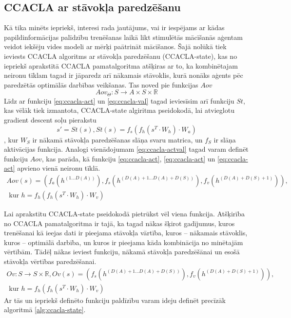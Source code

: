 \documentclass{ludis} %
\begin{document}
\subsection{CCACLA ar stāvokļa paredzēšanu}
Kā tika minēts iepriekš, interesi rada jautājums, vai ir iespējams ar kādas
papildinformācijas palīdzību trenēšanas laikā likt stimulētās mācīšanās aģentam
veidot iekšēju vides modeli ar mērķi paātrināt mācīšanos. Šajā nolūkā tiek
ieviests CCACLA algoritms ar stāvokļa paredzēšanu (CCACLA-state), kas no iepriekš aprakstītā
CCACLA pamatalgoritma atšķiras ar to, ka kombinētajam neironu tīklam tagad ir
jāparedz arī nākamais stāvoklis, kurā nonāks aģents pēc paredzētās optimālās
darbības veikšanas. Tas noved pie funkcijas $Aov$ 
\begin{equation}
  Aov_\Theta:S \rightarrow A \times S \times \mathbb{R}
\end{equation}
Līdz ar funkciju \ref{eq:ccacla-act} un \ref{eq:ccacla-val} tagad ieviesīsim arī
funkciju $St$, kas vēlāk tiek izmantota, CCACLA-state algiritma pseidokodā, lai
atvieglotu gradient descent soļu pierakstu
\begin{equation}\label{eq:ccacla-obs}
  s' = St(s), St(s) = f_s(f_h(s^T \cdot W_h) \cdot W_a)
\end{equation} 
, kur $W_S$ ir nākamā stāvokļa paredzēšanas slāņa svaru matrica, un $f_S$ ir
slāņa aktivācijas funkcija.
Analogi vienādojumam \ref{eq:ccacla-actval} tagad varam definēt funkciju $Aov$,
kas parāda, kā funkciju \ref{eq:ccacla-act}, \ref{eq:ccacla-act} un
\ref{eq:ccacla-act} apvieno vienā neironu tīklā.
\begin{multline}\label{eq:ccacla-actobsval}
  Aov(s) = \left(f_a(h^{(1 \ldots D(A))}),
                 f_s(h^{(D(A) + 1 \ldots D(A) + D(S))}),
                 f_v(h^{(D(A) + D(S) + 1)})\right), \\
  \text{ kur } h = f_h\left(f_h(s^T \cdot W_h) \cdot W_v\right)
\end{multline}

Lai aprakstītu CCACLA-state pseidokodā pietrūkst vēl viena funkcija. Atšķirība no
CCACLA pamatalgoritma ir tajā, ka tagad nākas šķirot gadījumus, kuros
trenēšanai kā ieejas dati ir pieejama stāvokļa vārtība, kuros -- nākamais
stāvoklis, kuros -- optimālā darbība, un kuros ir pieejama kāda kombinācija no
minētajām vērtībām. Tādēļ nākas ieviest funkciju, nākamā stāvokļa paredzēšānai
un esošā stāvokļa vērtības paredzēšanai.
\begin{multline}\label{eq:ccacla-obsval}
  Ov: S \rightarrow S \times \mathbb{R},
        Ov(s) = \left(f_s(h^{(D(A) + 1 \ldots D(A) + D(S))}),
                 f_v(h^{(D(A) + D(S) + 1)})\right), \\
  \text{ kur } h = f_h\left(f_h(s^T \cdot W_h) \cdot W_v\right)
\end{multline}
Ar tās un iepriekš definēto funkciju paldīzību varam ideju definēt precīzāk
algoritmā \ref{alg:ccacla-state}.
\end{document}
